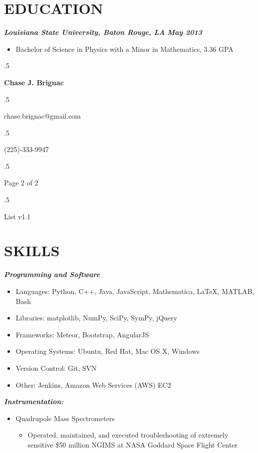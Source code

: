 \documentclass{res}
\begin{document}
\begin{resume}
\section{EDUCATION}
	{\bfseries {\em  Louisiana State University, Baton Rouge, LA}} \hfill   {\bfseries {\em May 2013}}\
                \begin{itemize}  \itemsep -14pt
                \item Bachelor of Science in Physics with a Minor in Mathematics, 3.36 GPA\\
                \end{itemize}



 \moveleft.5\hoffset\centerline{\large\bf Chase J. Brignac}
\moveleft.5\hoffset\centerline{chase.brignac@gmail.com}
\moveleft.5\hoffset\centerline{(225)-333-9947}
\moveleft.5\hoffset\centerline{Page 2 of 2}
\moveleft.5\hoffset\centerline{List v1.1}


\section{SKILLS}
	{\bfseries {\em Programming and Software}}
 		\begin{itemize} 
		\item Languages: Python, C++, Java, JavaScript, Mathematica, \LaTeX{}, MATLAB, Bash
		\item Libraries: matplotlib, NumPy, SciPy, SymPy, jQuery
		\item Frameworks: Meteor, Bootstrap, AngularJS
		\item Operating Systems: Ubuntu, Red Hat, Mac OS X, Windows
		\item Version Control: Git, SVN
		\item Other: Jenkins, Amazon Web Services (AWS) EC2
		\end{itemize}
	 {\bfseries {\em Instrumentation:}}
	 	\begin{itemize}
	 	\item Quadrupole Mass Spectrometers
	 	\begin{itemize}
	 	\item Operated, maintained, and executed troubleshooting of extremely sensitive \$50 million NGIMS at NASA Goddard Space Flight Center
	 	\end{itemize}


\end{itemize}
\end{resume}
\end{document}
